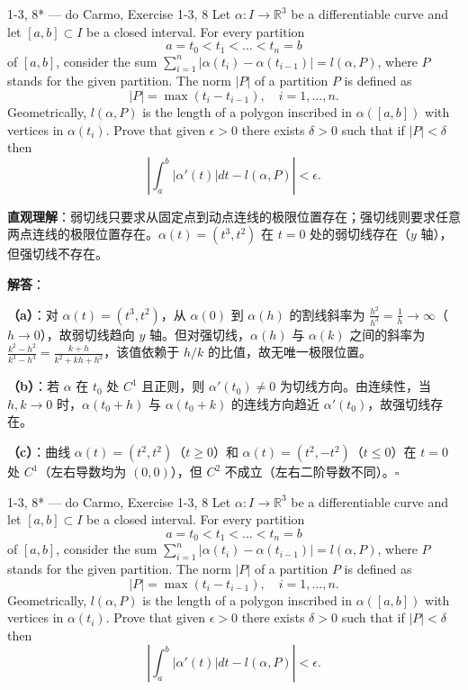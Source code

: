 \begin{exercise}{1-3, 8* — do Carmo, Exercise 1-3, 8}
Let $\alpha: I \to \mathbb{R}^3$ be a differentiable curve and let $[a, b] \subset I$ be a closed interval. For every partition
\[
a = t_0 < t_1 < \dots < t_n = b
\]
of $[a, b]$, consider the sum $\sum_{i=1}^n |\alpha(t_i) - \alpha(t_{i-1})| = l(\alpha, P)$, where $P$ stands for the given partition. The norm $|P|$ of a partition $P$ is defined as
\[
|P| = \max(t_i - t_{i-1}), \quad i = 1, \dots, n.
\]
Geometrically, $l(\alpha, P)$ is the length of a polygon inscribed in $\alpha([a, b])$ with vertices in $\alpha(t_i)$. Prove that given $\epsilon > 0$ there exists $\delta > 0$ such that if $|P| < \delta$ then
\[
\left| \int_a^b |\alpha'(t)| dt - l(\alpha, P) \right| < \epsilon.
\]
\end{exercise}

\begin{solution}
\textbf{直观理解}：弱切线只要求从固定点到动点连线的极限位置存在；强切线则要求任意两点连线的极限位置存在。$\alpha(t) = (t^3, t^2)$ 在 $t=0$ 处的弱切线存在（$y$ 轴），但强切线不存在。

\textbf{解答}：

\textbf{（a）}：对 $\alpha(t) = (t^3, t^2)$，从 $\alpha(0)$ 到 $\alpha(h)$ 的割线斜率为 $\frac{h^2}{h^3} = \frac{1}{h} \to \infty$（$h \to 0$），故弱切线趋向 $y$ 轴。但对强切线，$\alpha(h)$ 与 $\alpha(k)$ 之间的斜率为 $\frac{k^2 - h^2}{k^3 - h^3} = \frac{k+h}{k^2 + kh + h^2}$，该值依赖于 $h/k$ 的比值，故无唯一极限位置。

\textbf{（b）}：若 $\alpha$ 在 $t_0$ 处 $C^1$ 且正则，则 $\alpha'(t_0) \neq 0$ 为切线方向。由连续性，当 $h, k \to 0$ 时，$\alpha(t_0+h)$ 与 $\alpha(t_0+k)$ 的连线方向趋近 $\alpha'(t_0)$，故强切线存在。

\textbf{（c）}：曲线 $\alpha(t) = (t^2, t^2)$（$t \geq 0$）和 $\alpha(t) = (t^2, -t^2)$（$t \leq 0$）在 $t=0$ 处 $C^1$（左右导数均为 $(0,0)$），但 $C^2$ 不成立（左右二阶导数不同）。$\square$
\end{solution}

\begin{exercise}{1-3, 8* — do Carmo, Exercise 1-3, 8}
Let $\alpha: I \to \mathbb{R}^3$ be a differentiable curve and let $[a, b] \subset I$ be a closed interval. For every partition
\[
a = t_0 < t_1 < \dots < t_n = b
\]
of $[a, b]$, consider the sum $\sum_{i=1}^n |\alpha(t_i) - \alpha(t_{i-1})| = l(\alpha, P)$, where $P$ stands for the given partition. The norm $|P|$ of a partition $P$ is defined as
\[
|P| = \max(t_i - t_{i-1}), \quad i = 1, \dots, n.
\]
Geometrically, $l(\alpha, P)$ is the length of a polygon inscribed in $\alpha([a, b])$ with vertices in $\alpha(t_i)$. Prove that given $\epsilon > 0$ there exists $\delta > 0$ such that if $|P| < \delta$ then
\[
\left| \int_a^b |\alpha'(t)| dt - l(\alpha, P) \right| < \epsilon.
\]
\end{exercise}

